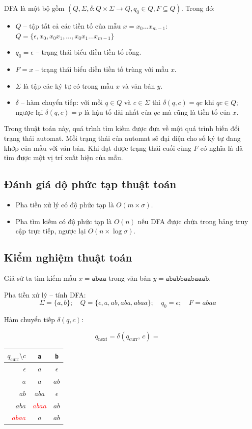\documentclass[12pt,twoside,openright]{extreport}
\begin{document}
DFA là một bộ gồm $(Q, \Sigma, \delta: Q \times \Sigma \rightarrow Q, q_0 \in Q, F \subseteq Q)$. Trong đó:
\begin{itemize}
	\item $Q$ -- tập tất cả các tiền tố của mẫu $x = x_0 \ldots x_{m-1}$: $Q = \{\epsilon, x_0, x_0 x_1, \ldots, x_0 x_1 \ldots x_{m-1}\}$
	\item $q_0 = \epsilon$ -- trạng thái biểu diễn tiền tố rỗng.
	\item $F = x$ -- trạng thái biểu diễn tiền tố trùng với mẫu $x$.
	\item $\Sigma$ là tập các ký tự có trong mẫu $x$ và văn bản $y$.
	\item $\delta$ -- hàm chuyển tiếp: với mỗi $q \in Q$ và $c \in \Sigma$ thì $\delta(q, c) = qc$ khi $qc \in Q$; ngược lại $\delta(q, c) = p$ là hậu tố dài nhất của $qc$ mà cũng là tiền tố của $x$.
\end{itemize}

Trong thuật toán này, quá trình tìm kiếm được đưa về một quá trình biến đổi trạng thái automat. Mỗi trạng thái của automat sẽ đại diện cho số ký tự đang khớp của mẫu với văn bản. Khi đạt được trạng thái cuối cùng $F$ có nghĩa là đã tìm được một vị trí xuất hiện của mẫu.

\subsection{Đánh giá độ phức tạp thuật toán}

\begin{itemize}
	\item Pha tiền xử lý có độ phức tạp là $O(m \times \sigma)$.
	\item Pha tìm kiếm có độ phức tạp là $O(n)$ nếu DFA được chứa trong bảng truy cập trực tiếp, ngược lại $O(n \times \log \sigma)$.
\end{itemize}

\subsection{Kiểm nghiệm thuật toán}

Giả sử ta tìm kiếm mẫu $x = \texttt{abaa}$ trong văn bản $y = \texttt{ababbaabaaab}$.

Pha tiền xử lý -- tính DFA:
\[
\Sigma = \{a, b\};\quad Q = \{\epsilon, a, ab, aba, abaa\};\quad q_0 = \epsilon;\quad F = abaa
\]

Hàm chuyển tiếp $\delta(q, c)$:

\[
q_{\text{next}} = \delta(q_{\text{curr}},\, c) =
\]
\begin{center}
\begin{tabular}{r|cc}
$q_{\text{curr}} \setminus c$ & \texttt{a} & \texttt{b} \\
\hline
$\epsilon$ & $a$ & $\epsilon$ \\
$a$ & $a$ & $ab$ \\
$ab$ & $aba$ & $\epsilon$ \\
$aba$ & \textcolor{red}{$abaa$} & $ab$ \\
\textcolor{red}{$abaa$} & $a$ & $ab$ \\
\end{tabular}
\end{center}
\end{document}

